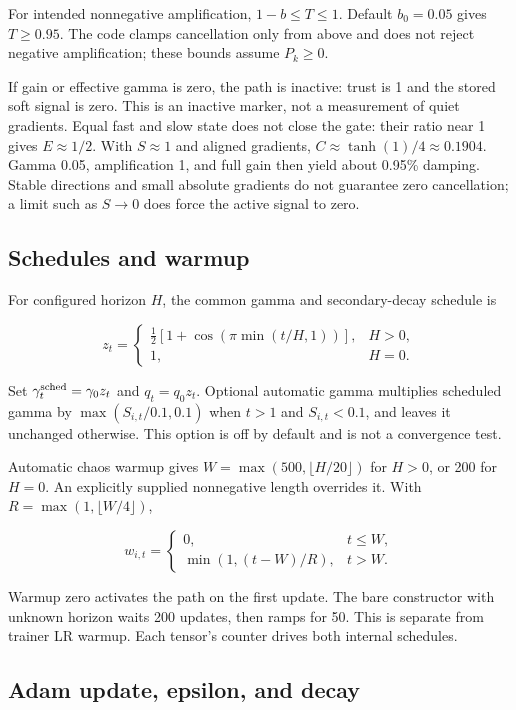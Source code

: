 \documentclass[11pt,a4paper]{article}
\theoremstyle{definition}
\theoremstyle{remark}
\begin{document}
For intended nonnegative amplification, $1-b\leq T\leq1$. Default $b_0=0.05$ gives $T\geq0.95$. The code clamps cancellation only from above and does not reject negative amplification; these bounds assume $P_k\geq0$.

If gain or effective gamma is zero, the path is inactive: trust is 1 and the stored soft signal is zero. This is an inactive marker, not a measurement of quiet gradients. Equal fast and slow state does not close the gate: their ratio near 1 gives $E\approx1/2$. With $S\approx1$ and aligned gradients, $C\approx\tanh(1)/4\approx0.1904$. Gamma 0.05, amplification 1, and full gain then yield about 0.95\% damping. Stable directions and small absolute gradients do not guarantee zero cancellation; a limit such as $S\to0$ does force the active signal to zero.

\subsection{Schedules and warmup}

For configured horizon $H$, the common gamma and secondary-decay schedule is

\[
z_t=\begin{cases}\tfrac12[1+\cos(\pi\min(t/H,1))],&H>0,\\1,&H=0.\end{cases}
\]

Set $\gamma_t^{\rm sched}=\gamma_0z_t$ and $q_t=q_0z_t$. Optional automatic gamma multiplies scheduled gamma by $\max(S_{i,t}/0.1,0.1)$ when $t>1$ and $S_{i,t}<0.1$, and leaves it unchanged otherwise. This option is off by default and is not a convergence test.

Automatic chaos warmup gives $W=\max(500,\lfloor H/20\rfloor)$ for $H>0$, or 200 for $H=0$. An explicitly supplied nonnegative length overrides it. With $R=\max(1,\lfloor W/4\rfloor)$,

\[
w_{i,t}=\begin{cases}0,&t\leq W,\\\min(1,(t-W)/R),&t>W.\end{cases}
\]

Warmup zero activates the path on the first update. The bare constructor with unknown horizon waits 200 updates, then ramps for 50. This is separate from trainer LR warmup. Each tensor's counter drives both internal schedules.

\subsection{Adam update, epsilon, and decay}
\end{document}
